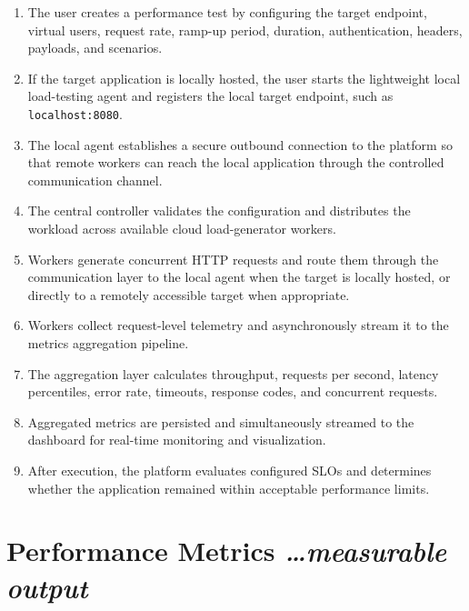 \documentclass[11pt,a4paper]{article}
\newcommand{\BvrHint}[1]{%
  {\normalfont\normalsize\itshape\hfill #1}}
\begin{document}
\begin{enumerate}[leftmargin=0.7cm]

    \item The user creates a performance test by configuring the target
    endpoint, virtual users, request rate, ramp-up period, duration,
    authentication, headers, payloads, and scenarios.

    \item If the target application is locally hosted, the user starts
    the lightweight local load-testing agent and registers the local
    target endpoint, such as \texttt{localhost:8080}.

    \item The local agent establishes a secure outbound connection to
    the platform so that remote workers can reach the local
    application through the controlled communication channel.

    \item The central controller validates the configuration and
    distributes the workload across available cloud load-generator
    workers.

    \item Workers generate concurrent HTTP requests and route them
    through the communication layer to the local agent when the
    target is locally hosted, or directly to a remotely accessible
    target when appropriate.

    \item Workers collect request-level telemetry and asynchronously
    stream it to the metrics aggregation pipeline.

    \item The aggregation layer calculates throughput, requests per
    second, latency percentiles, error rate, timeouts, response codes,
    and concurrent requests.

    \item Aggregated metrics are persisted and simultaneously streamed
    to the dashboard for real-time monitoring and visualization.

    \item After execution, the platform evaluates configured SLOs and
    determines whether the application remained within acceptable
    performance limits.

\end{enumerate}

\section{Performance Metrics%
  \BvrHint{\ldots measurable output}}
\end{document}
